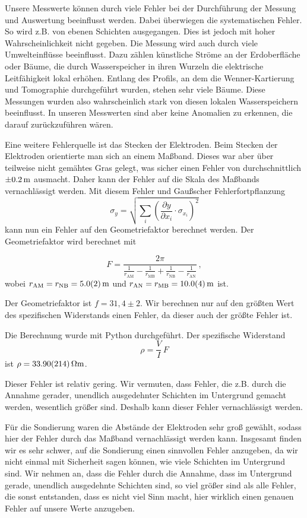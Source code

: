 Unsere Messwerte können durch viele Fehler bei der Durchführung der Messung und Auswertung beeinflusst werden. Dabei überwiegen die systematischen Fehler. So wird z.B. von ebenen Schichten ausgegangen. Dies ist jedoch mit hoher Wahrscheinlichkeit nicht gegeben. 
Die Messung wird auch durch viele Umwelteinflüsse beeinflusst. Dazu zählen künstliche Ströme an der Erdoberfläche oder Bäume, die durch Wasserspeicher in ihren Wurzeln die elektrische Leitfähigkeit lokal erhöhen. Entlang des Profils, an dem die Wenner-Kartierung und Tomographie durchgeführt wurden, stehen sehr viele Bäume. Diese Messungen wurden also wahrscheinlich stark von diesen lokalen Wasserspeichern beeinflusst. In unseren Messwerten sind aber keine Anomalien zu erkennen, die darauf zurückzuführen wären.

Eine weitere Fehlerquelle ist das Stecken der Elektroden. Beim Stecken der Elektroden orientierte man sich an einem Maßband. Dieses war aber über teilweise nicht gemähtes Gras gelegt, was sicher einen Fehler von durchschnittlich  $\SI{\pm 0,2}{m}$ ausmacht. Daher kann der Fehler auf die Skala des Maßbands vernachlässigt werden.  
Mit diesem Fehler und Gaußscher Fehlerfortpflanzung 
\begin{equation}
\sigma_y = \sqrt{\sum_i \left( \frac{\partial y}{\partial x_i}\cdot \sigma_{x_i}\right)^2}
\end{equation}
kann nun ein Fehler auf den Geometriefaktor berechnet werden. Der Geometriefaktor wird berechnet mit 

$$F = \frac{2 \pi}{\frac{1}{r_{\mathrm{AM}}} - \frac{1}{r_{\mathrm{MB}}} + \frac{1}{r_{\mathrm{NB}}} - \frac{1}{r_{\mathrm{AN}}}}\,,$$
wobei $ r_\mathrm{AM} = r_\mathrm{NB} = \SI{5 \pm 0.2}{m}$  und $ r_{\mathrm{AN}} =  r_{\mathrm{MB}} = \SI{10 \pm 0.4}{m}$ ist.

Der Geometriefaktor ist $f= 31,4 \pm 2 $. 
Wir berechnen nur auf den größten Wert des spezifischen Widerstands einen Fehler, da dieser auch der größte Fehler ist. 

Die Berechnung wurde mit Python durchgeführt. Der spezifische Widerstand
\begin{equation}
\rho = \frac{V}{I} \, F
\end{equation}
ist $\rho= \SI{33,9 \pm 2,14}{\Omega m}$.

Dieser Fehler ist relativ gering. Wir vermuten, dass Fehler, die z.B. durch die Annahme gerader, unendlich ausgedehnter Schichten im Untergrund gemacht werden, wesentlich größer sind. Deshalb kann dieser Fehler vernachlässigt werden.

Für die Sondierung waren die Abstände der Elektroden sehr groß gewählt, sodass hier der Fehler durch das Maßband vernachlässigt werden kann. Insgesamt finden wir es sehr schwer, auf die Sondierung einen sinnvollen Fehler anzugeben, da wir nicht einmal mit Sicherheit sagen können, wie viele Schichten im Untergrund sind. Wir nehmen an, dass die Fehler durch die Annahme, dass im Untergrund gerade, unendlich ausgedehnte Schichten sind, so viel größer sind als alle Fehler, die sonst entstanden, dass es nicht viel Sinn macht, hier wirklich einen genauen Fehler auf unsere Werte anzugeben.